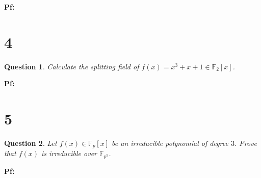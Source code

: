 \documentclass{article}
\newtheorem{question}{Question}
\begin{document}
\textbf{Pf:}

\break

\section*{4}
\begin{myBox}[]{}
    \begin{question}
        Calculate the splitting field of $f(x)=x^3+x+1\in\mathbb{F}_2[x]$.
    \end{question}
\end{myBox}

\textbf{Pf:}

\break

\section*{5}
\begin{myBox}[]{}
    \begin{question}
        Let $f(x)\in\mathbb{F}_p[x]$ be an irreducible polynomial of degree $3$. Prove that $f(x)$ is irreducible over $\mathbb{F}_{p^5}$.
    \end{question}
\end{myBox}

\textbf{Pf:}
\end{document}
